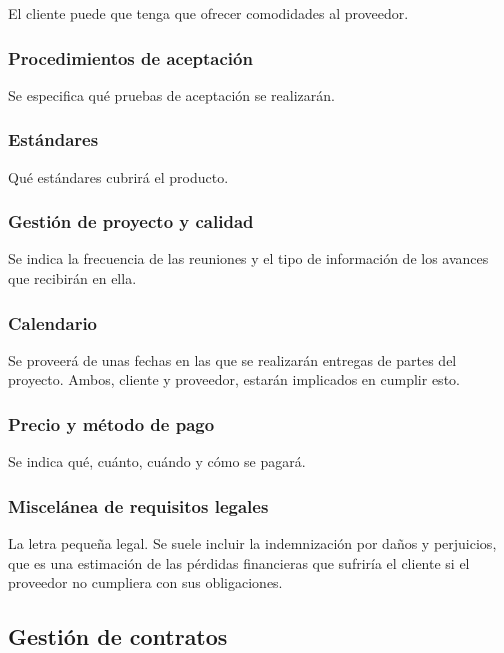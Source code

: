 \documentclass[12pt]{article}
\begin{document}
{El cliente puede que tenga que ofrecer comodidades al proveedor.}

\subsubsection{Procedimientos de aceptación}
\label{10.4.7}

{Se especifica qué pruebas de aceptación se realizarán.}

\subsubsection{Estándares}
\label{10.4.8}

{Qué estándares cubrirá el producto.}

\subsubsection{Gestión de proyecto y calidad}
\label{10.4.9}

{Se indica la frecuencia de las reuniones y el tipo de información de los avances que recibirán en ella.}

\subsubsection{Calendario}
\label{10.4.10}

{Se proveerá de unas fechas en las que se realizarán entregas de partes del proyecto. Ambos, cliente y proveedor, estarán implicados en cumplir esto.}

\subsubsection{Precio y método de pago}
\label{10.4.11}

{Se indica qué, cuánto, cuándo y cómo se pagará.}

\subsubsection{Miscelánea de requisitos legales}
\label{10.4.12}

{La letra pequeña legal. Se suele incluir la indemnización por daños y perjuicios, que es una estimación de las pérdidas financieras que sufriría el cliente si el proveedor no cumpliera con sus obligaciones.}

\subsection{Gestión de contratos}
\label{10.5.0}
\end{document}
